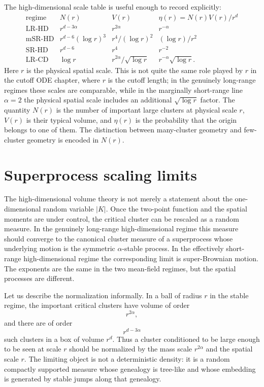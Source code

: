 \documentclass[11pt,reqno]{book}
\numberwithin{equation}{chapter}
\theoremstyle{plain}
\theoremstyle{definition}
\theoremstyle{remark}
\newcommand{\1}{\mathbf 1}
\begin{document}
The high-dimensional scale table is useful enough to record explicitly:
\[
\begin{array}{c|c|c|c}
\text{regime} & N(r) & V(r) & \eta(r)=N(r)V(r)/r^d\\
\hline
\text{LR-HD} & r^{d-3\alpha} & r^{2\alpha} & r^{-\alpha}\\
\text{mSR-HD} & r^{d-6}(\log r)^3 & r^4/(\log r)^2 & (\log r)/r^2\\
\text{SR-HD} & r^{d-6} & r^4 & r^{-2}\\
\text{LR-CD} & \log r & r^{2\alpha}/\sqrt{\log r} & r^{-\alpha}\sqrt{\log r}.
\end{array}
\]
Here $r$ is the physical spatial scale. This is not quite the same role played by $r$ in the cutoff ODE chapter, where $r$ is the cutoff length; in the genuinely long-range regimes these scales are comparable, while in the marginally short-range line $\alpha=2$ the physical spatial scale includes an additional $\sqrt{\log r}$ factor. The quantity $N(r)$ is the number of important large clusters at physical scale $r$, $V(r)$ is their typical volume, and $\eta(r)$ is the probability that the origin belongs to one of them. The distinction between many-cluster geometry and few-cluster geometry is encoded in $N(r)$.

\section{Superprocess scaling limits}

The high-dimensional volume theory is not merely a statement about the one-dimensional random variable $|K|$. Once the two-point function and the spatial moments are under control, the critical cluster can be rescaled as a random measure. In the genuinely long-range high-dimensional regime this measure should converge to the canonical cluster measure of a superprocess whose underlying motion is the symmetric $\alpha$-stable process. In the effectively short-range high-dimensional regime the corresponding limit is super-Brownian motion. The exponents are the same in the two mean-field regimes, but the spatial processes are different.

Let us describe the normalization informally. In a ball of radius $r$ in the stable regime, the important critical clusters have volume of order
\[
  r^{2\alpha},
\]
and there are of order
\[
  r^{d-3\alpha}
\]
such clusters in a box of volume $r^d$. Thus a cluster conditioned to be large enough to be seen at scale $r$ should be normalized by the mass scale $r^{2\alpha}$ and the spatial scale $r$. The limiting object is not a deterministic density: it is a random compactly supported measure whose genealogy is tree-like and whose embedding is generated by stable jumps along that genealogy.
\end{document}
